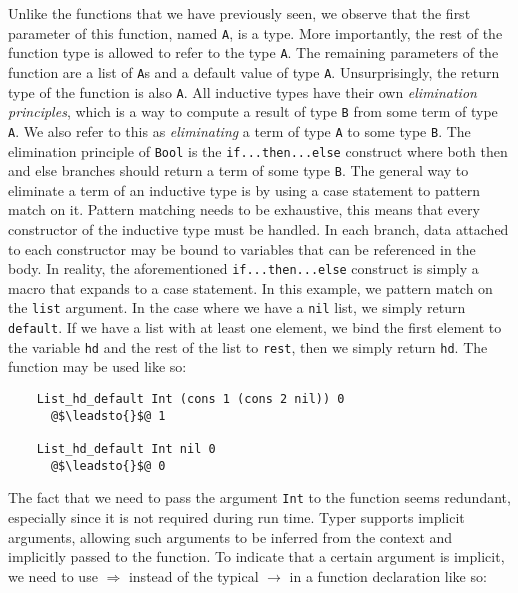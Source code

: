 \documentclass[12pt,twoside,maitrise]{dms}
\theoremstyle{definition}
\numberwithin{equation}{section}
\numberwithin{table}{chapter}
\numberwithin{figure}{chapter}
\newcommand\kw[1] {\textsf{#1}}
\newcommand\id[1] {\texttt{#1}}
\newcommand\fn[1] {\texttt{#1}}
\begin{document}
Unlike the functions that we have previously seen, we observe that the first
parameter of this function, named \id{A}, is a type. More importantly, the rest
of the function type is allowed to refer to the type \id{A}. The remaining
parameters of the function are a list of \id{A}s and a default value of type
\id{A}. Unsurprisingly, the return type of the function is also \id{A}. All
inductive types have their own \emph{elimination principles}, which is a way to
compute a result of type \id{B} from some term of type \id{A}. We also refer to
this as \emph{eliminating} a term of type \id{A} to some type \id{B}.
The elimination principle of \id{Bool} is the
\fn{\kw{if}...\kw{then}...\kw{else}} construct where both \kw{then} and
\kw{else} branches should return a term of some type \id{B}. The general way to
eliminate a term of an inductive type is by using a \kw{case} statement to
pattern match on it. Pattern matching needs to be exhaustive, this means that
every constructor of the inductive type must be handled. In each branch, data
attached to each constructor may be bound to variables that can be referenced
in the body. In reality, the aforementioned
\fn{\kw{if}...\kw{then}...\kw{else}} construct is simply a macro that expands
to a \kw{case} statement. In this example, we pattern match on the \id{list}
argument. In the case where we have a \id{nil} list, we simply return
\id{default}. If we have a list with at least one element, we bind the first
element to the variable \id{hd} and the rest of the list to \id{rest}, then we
simply return \id{hd}. The function may be used like so:

\begin{verbatim}
    List_hd_default Int (cons 1 (cons 2 nil)) 0
      @$\leadsto{}$@ 1

    List_hd_default Int nil 0
      @$\leadsto{}$@ 0
\end{verbatim}

The fact that we need to pass the argument \id{Int} to the function seems
redundant, especially since it is not required during run time. Typer supports
implicit arguments, allowing such arguments to be inferred from the context and
implicitly passed to the function. To indicate that a certain argument is
implicit, we need to use $\Rightarrow$ instead of the typical $\rightarrow$ in
a function declaration like so:
\end{document}
